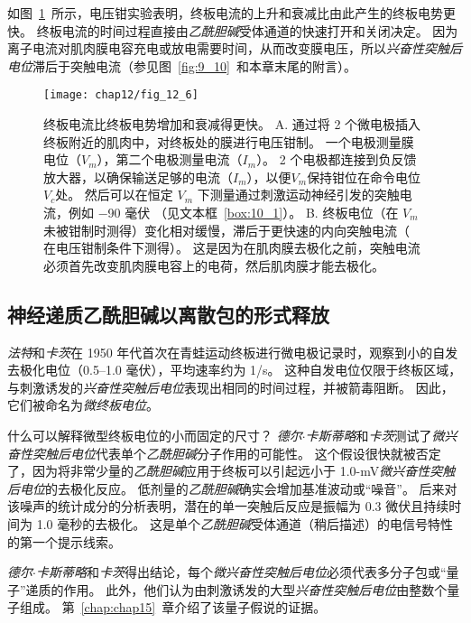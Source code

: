 如图~\ref{fig:12_6}~所示，电压钳实验表明，终板电流的上升和衰减比由此产生的终板电势更快。
终板电流的时间过程直接由\textit{乙酰胆碱}受体通道的快速打开和关闭决定。
因为离子电流对肌肉膜电容充电或放电需要时间，从而改变膜电压，所以\textit{兴奋性突触后电位}滞后于突触电流（参见图~\ref{fig:9_10}~和本章末尾的附言）。


\begin{figure}[htbp]
	\centering
	\texttt{[image: chap12/fig\_12\_6]}
	\caption{终板电流比终板电势增加和衰减得更快。
		A. 通过将 2 个微电极插入终板附近的肌肉中，对终板处的膜进行电压钳制。
		一个电极测量膜电位（$V_m$），第二个电极测量电流（$I_m$）。
		2 个电极都连接到负反馈放大器，以确保输送足够的电流（$I_m$），以便$V_m$保持钳位在命令电位 $V_c$处。
		然后可以在恒定 $V_m$ 下测量通过刺激运动神经引发的突触电流，例如 −90 毫伏 （见文本框~\ref{box:10_1}）。
		B. 终板电位（在 $V_m$ 未被钳制时测得）变化相对缓慢，滞后于更快速的内向突触电流（ 在电压钳制条件下测得）。
		这是因为在肌肉膜去极化之前，突触电流必须首先改变肌肉膜电容上的电荷，然后肌肉膜才能去极化。}
	\label{fig:12_6}
\end{figure}



\subsection{神经递质乙酰胆碱以离散包的形式释放}

\textit{法特}和\textit{卡茨}在 1950 年代首次在青蛙运动终板进行微电极记录时，观察到小的自发去极化电位（0.5–1.0 毫伏），平均速率约为 1/s。 
这种自发电位仅限于终板区域，与刺激诱发的\textit{兴奋性突触后电位}表现出相同的时间过程，并被箭毒阻断。 
因此，它们被命名为\textit{微终板电位}。


什么可以解释微型终板电位的小而固定的尺寸？ 
\textit{德尔$\cdot$卡斯蒂略}和\textit{卡茨}测试了\textit{微兴奋性突触后电位}代表单个\textit{乙酰胆碱}分子作用的可能性。
这个假设很快就被否定了，因为将非常少量的\textit{乙酰胆碱}应用于终板可以引起远小于 1.0-mV\textit{微兴奋性突触后电位}的去极化反应。
低剂量的\textit{乙酰胆碱}确实会增加基准波动或“噪音”。 
后来对该噪声的统计成分的分析表明，潜在的单一突触后反应是振幅为 0.3 微伏且持续时间为 1.0 毫秒的去极化。 
这是单个\textit{乙酰胆碱}受体通道（稍后描述）的电信号特性的第一个提示线索。


\textit{德尔$\cdot$卡斯蒂略}和\textit{卡茨}得出结论，每个\textit{微兴奋性突触后电位}必须代表多分子包或“量子”递质的作用。 
此外，他们认为由刺激诱发的大型\textit{兴奋性突触后电位}由整数个量子组成。 
第~\ref{chap:chap15}~章介绍了该量子假说的证据。



